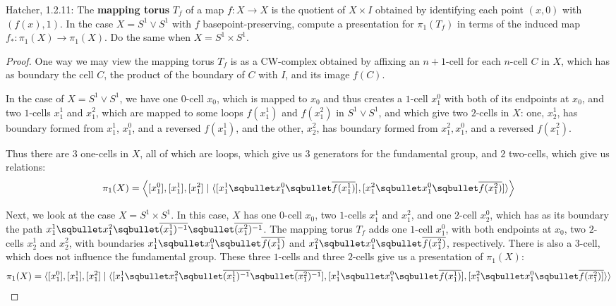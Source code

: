 \documentclass[12pt]{article}
\theoremstyle{definition}
\newenvironment{problem}[2][Problem]{\begin{trivlist}
\item[\hskip \labelsep {\bfseries #1}\hskip \labelsep {\bfseries #2.}]}{\end{trivlist}}
\begin{document}
\begin{problem}{2}
	Hatcher, 1.2.11: The \textbf{mapping torus} $T_f$ of a map $f : X \to X$ is the quotient of $X\times I$ obtained by identifying each point $(x,0)$ with $(f(x),1)$. In the case $X = S^1 \vee S^1$ with $f$ basepoint-preserving, compute a presentation for $\pi_1(T_f)$ in terms of the induced map $f_*: \pi_1(X) \to \pi_1(X)$. Do the same when $X = S^1 \times S^1$.
	\begin{proof}
		One way we may view the mapping torus $T_f$ is as a CW-complex obtained by affixing an $n+1$-cell for each $n$-cell $C$ in $X$, which has as boundary the cell $C$, the product of the boundary of $C$ with $I$,  and its image $f(C)$. 
	\par In the case of $X = S^1 \vee S^1$, we have one $0$-cell $x_0$, which is mapped to $x_0$ and thus creates a $1$-cell $x_1^0$ with both of its endpoints at $x_0$, and two $1$-cells $x_1^1$ and $x_1^2$, which are mapped to some loops $f(x_1^1)$ and $f(x_1^2)$ in $S^1 \vee S^1$, and which give two $2$-cells in $X$: one, $x_2^1$, has boundary formed from $x_1^1$, $x_1^0$, and a reversed $f(x_1^1)$, and the other, $x_2^2$, has boundary formed from $x_1^2, x_1^0$, and a reversed $f(x_1^2)$. 
	\par Thus there are $3$ one-cells in $X$, all of which are loops, which give us $3$ generators for the fundamental group, and $2$ two-cells, which give us relations:
		\[\pi_1(X) = \left\langle [x_1^0], [x_1^1], [x_1^2] \mid \langle [x_1^1 \sqbullet x_1^0 \sqbullet \overline{f(x_1^1)}], [x_1^2 \sqbullet x_1^0 \sqbullet \overline{f(x_1^2)}]\rangle  \right\rangle\]

		\par Next, we look at the case $X = S^1 \times S^1$. In this case, $X$ has one $0$-cell $x_0$, two $1$-cells $x_1^1$ and $x_1^2$, and one $2$-cell $x_2^0$, which has as its boundary the path $x_1^1 \sqbullet x_1^2 \sqbullet \overline{(x_1^1)^{-1}} \sqbullet \overline{(x_1^2)^{-1}}$. The mapping torus $T_f$ adds one $1$-cell $x_1^0$, with both endpoints at $x_0$, two $2$-cells $x_2^1$ and $x_2^2$, with boundaries $x_1^1 \sqbullet x_1^0 \sqbullet \overline{f(x_1^1)}$ and $x_1^2 \sqbullet x_1^0 \sqbullet \overline{f(x_1^2)}$, respectively. There is also a $3$-cell, which does not influence the fundamental group. These three $1$-cells and three $2$-cells give us a presentation of $\pi_1(X)$:
	\[\pi_1(X) = \langle  [x_1^0], [x_1^1], [x_1^2] \mid \langle [x_1^1 \sqbullet x_1^2 \sqbullet \overline{(x_1^1)^{-1}} \sqbullet \overline{(x_1^2)^{-1}}], [x_1^1 \sqbullet x_1^0 \sqbullet \overline{f(x_1^1)}], [x_1^2 \sqbullet x_1^0 \sqbullet \overline{f(x_1^2)]} \rangle \rangle \]
	\end{proof}
\end{problem}
\maketitle
\end{document}
